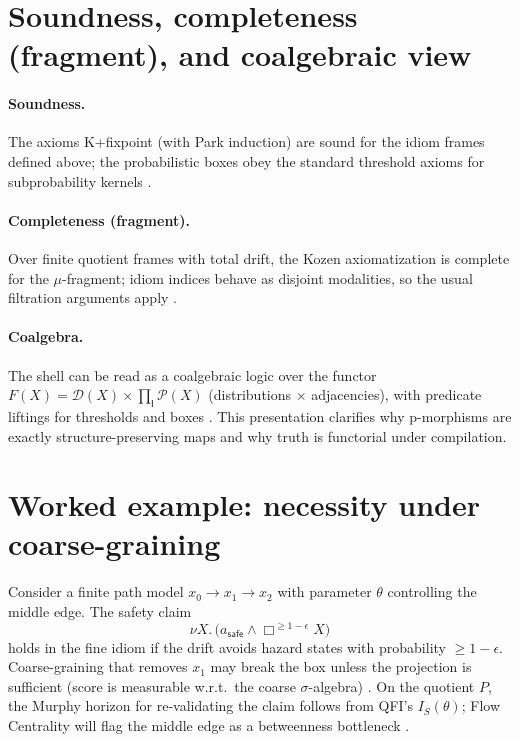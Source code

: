 \documentclass[11pt]{article}
\theoremstyle{plain}
\theoremstyle{definition}
\theoremstyle{remark}
\newcommand{\1}{\mathbbm{1}}
\begin{document}
\section{Soundness, completeness (fragment), and coalgebraic view}\label{sec:sc}
\paragraph{Soundness.} The axioms K+fixpoint (with Park induction) are sound for the idiom frames defined above; the probabilistic boxes obey the standard threshold axioms for subprobability kernels \parencite[Ch.\ 8]{BlackburnRijkeVenema2001}.

\paragraph{Completeness (fragment).} Over finite quotient frames with total drift, the Kozen axiomatization is complete for the $\mu$-fragment; idiom indices behave as disjoint modalities, so the usual filtration arguments apply \parencite{Kozen1983,Stirling2001}.

\paragraph{Coalgebra.} The shell can be read as a coalgebraic logic over the functor $F(X)=\mathcal{D}(X)\times \prod_{\mathsf{I}}\mathcal{P}(X)$ (distributions $\times$ adjacencies), with predicate liftings for thresholds and boxes \parencite{Rutten2000,Jacobs2017}. This presentation clarifies why p-morphisms are exactly structure-preserving maps and why truth is functorial under compilation.

\section{Worked example: necessity under coarse-graining}
Consider a finite path model $x_0\to x_1\to x_2$ with parameter $\theta$ controlling the middle edge. The safety claim
\[
\nu X.\,\Big(a_{\textsf{safe}} \land \Box^{\ge 1-\epsilon} X\Big)
\]
holds in the fine idiom if the drift avoids hazard states with probability $\ge 1-\epsilon$. Coarse-graining that removes $x_1$ may break the box unless the projection is sufficient (score is measurable w.r.t.\ the coarse $\sigma$-algebra) \parencite{Blackwell1953,AmariNagaoka2000}. On the quotient $P$, the Murphy horizon for re-validating the claim follows from QFI’s $I_S(\theta)$; Flow Centrality will flag the middle edge as a betweenness bottleneck \parencite{elliott2025qfi,elliott2025flow,DemboZeitouni1998}.
\end{document}

